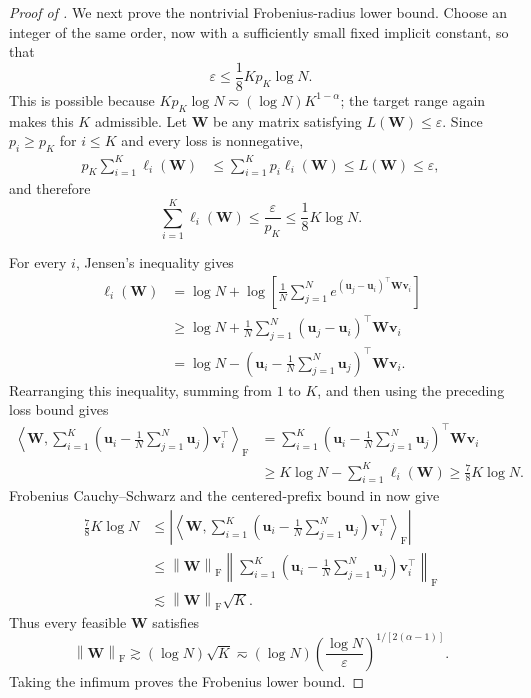 \documentclass[11pt]{article}
\theoremstyle{definition}
\newcommand{\ub}{\mathbf{u}}
\newcommand{\vb}{\mathbf{v}}
\newcommand{\Wb}{\mathbf{W}}
\newcommand{\eps}{\varepsilon}
\newcommand{\normF}[1]{\left\lVert #1\right\rVert_{\mathrm F}}
\begin{document}
\begin{proof}[Proof of ]
We next prove the nontrivial Frobenius-radius lower bound.  Choose an integer
of the same order, now with a sufficiently small fixed implicit constant,
so that
\[
 \eps\leq\frac18Kp_K\log N.
\]
This is possible because $Kp_K\log N\eqsim(\log N)K^{1-\alpha}$; the target
range again makes this $K$ admissible.  Let $\Wb$ be any matrix satisfying
$L(\Wb)\leq\eps$.  Since $p_i\geq p_K$ for $i\leq K$ and every loss is
nonnegative,
\begin{align*}
 p_K\sum_{i=1}^K\ell_i(\Wb)
 &\leq\sum_{i=1}^Kp_i\ell_i(\Wb)\leq L(\Wb)\leq\eps,
\end{align*}
and therefore
\[
 \sum_{i=1}^K\ell_i(\Wb)
 \leq\frac{\eps}{p_K}
 \leq\frac18K\log N.
\]

For every $i$, Jensen's inequality gives
\begin{align*}
 \ell_i(\Wb)
 &=\log N
 +\log\!\left[
  \frac1N\sum_{j=1}^N
  e^{(\ub_j-\ub_i)^\top\Wb\vb_i}
 \right]\\
 &\geq\log N
 +\frac1N\sum_{j=1}^N
 (\ub_j-\ub_i)^\top\Wb\vb_i\\
 &=\log N
 -\left(\ub_i-\frac1N\sum_{j=1}^N\ub_j\right)^\top\Wb\vb_i.
\end{align*}
Rearranging this inequality, summing from $1$ to $K$, and then using the
preceding loss bound gives
\begin{align*}
 \left\langle
  \Wb,
  \sum_{i=1}^K
  \left(\ub_i-\frac1N\sum_{j=1}^N\ub_j\right)\vb_i^\top
 \right\rangle_{\mathrm F} &=
 \sum_{i=1}^K
 \left(\ub_i-\frac1N\sum_{j=1}^N\ub_j\right)^\top\Wb\vb_i\\
 &\geq
 K\log N-\sum_{i=1}^K\ell_i(\Wb)\geq\frac78K\log N.
\end{align*}
Frobenius Cauchy--Schwarz and the centered-prefix bound in
 now give
\begin{align*}
 \frac78K\log N
 &\leq
 \left|
  \left\langle
   \Wb,
   \sum_{i=1}^K
   \left(\ub_i-\frac1N\sum_{j=1}^N\ub_j\right)\vb_i^\top
  \right\rangle_{\mathrm F}
 \right|\\
 &\leq
 \normF{\Wb}
 \left\|
  \sum_{i=1}^K
  \left(\ub_i-\frac1N\sum_{j=1}^N\ub_j\right)\vb_i^\top
 \right\|_{\mathrm F}\\
 &\lesssim\normF{\Wb}\sqrt K.
\end{align*}
Thus every feasible $\Wb$ satisfies
\[
 \normF{\Wb}
 \gtrsim(\log N)\sqrt K
 \eqsim(\log N)
 \left(\frac{\log N}{\eps}\right)^{1/[2(\alpha-1)]}.
\]
Taking the infimum proves the Frobenius lower bound.


\end{proof}
\end{document}
